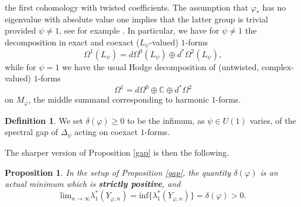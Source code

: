 \documentclass[11pt]{amsart}
\newtheorem{prop}{Proposition}[section]
\theoremstyle{definition}
\newtheorem{defn}{Definition}[section]
\theoremstyle{remark}
\begin{document}
the first cohomology with twisted coefficients. The assumption that $\varphi_*$ has no eigenvalue with absolute value one implies that the latter group is trivial provided $\psi\neq 1$, see for example \cite[Ch. 5]{DK}. In particular, we have for $\psi\neq 1$ the decomposition in exact and coexact ($L_{\psi}$-valued) $1$-forms
\begin{equation}\label{twistedhodge}
\Omega^1(L_{\psi})=d\Omega^0(L_{\psi})\oplus d^*\Omega^2(L_{\psi}),
\end{equation}
while for $\psi=1$ we have the usual Hodge decomposition of (untwisted, complex-valued) $1$-forms
\begin{equation}\label{hodge}
\Omega^1=d\Omega^0 \oplus\mathbb{C}\oplus d^*\Omega^2
\end{equation}
on $M_\varphi$, the middle summand corresponding to harmonic $1$-forms.
\begin{defn}
We set $\delta(\varphi)\geq0$ to be the infimum, as $\psi\in U(1)$ varies, of the spectral gap of $\Delta_{\psi}$ acting on coexact $1$-forms.\end{defn}
The sharper version of Proposition \ref{gap} is then the following.
\begin{prop}\label{mainprop}
In the setup of Proposition \ref{gap}, the quantity $\delta(\varphi)$ is an actual minimum which is \textbf{strictly positive}, and
\begin{equation*}
\mathrm{lim}_{n\rightarrow\infty} \lambda_1^*(Y_{\varphi,n})=\mathrm{inf}\{\lambda_1^*(Y_{\varphi,n})\}=\delta(\varphi)>0.
\end{equation*}
\end{prop}
\end{document}
